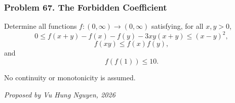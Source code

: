 \subsubsection*{Problem 67. The Forbidden Coefficient}

\begin{exercisebox}[hard]

Determine all functions $f:(0,\infty)\to(0,\infty)$ satisfying, for all $x,y>0$,
\[
\boxed{
0\le f(x+y)-f(x)-f(y)-3xy(x+y)\le(x-y)^2,
}
\tag{1}
\]
\[
\boxed{\qquad f(xy)\le f(x)f(y),\qquad} \tag{2}
\]
and
\[
\boxed{\qquad f(f(1))\le10.\qquad} \tag{3}
\]

No continuity or monotonicity is assumed.

\begin{flushright}
\textit{Proposed by Vu Hung Nguyen, 2026}
\end{flushright}


\end{exercisebox}
